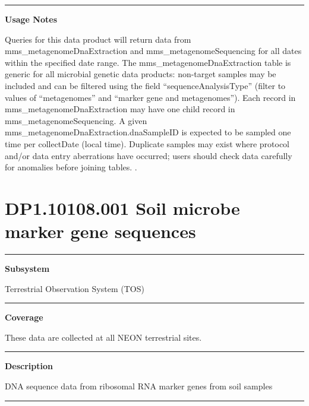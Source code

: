 \documentclass[]{article}
\begin{document}
\begin{center}\rule{0.5\linewidth}{\linethickness}\end{center}

\textbf{Usage Notes}

Queries for this data product will return data from
mms\_metagenomeDnaExtraction and mms\_metagenomeSequencing for all dates
within the specified date range. The mms\_metagenomeDnaExtraction table
is generic for all microbial genetic data products: non-target samples
may be included and can be filtered using the field
``sequenceAnalysisType'' (filter to values of ``metagenomes'' and
``marker gene and metagenomes''). Each record in
mms\_metagenomeDnaExtraction may have one child record in
mms\_metagenomeSequencing. A given
mms\_metagenomeDnaExtraction.dnaSampleID is expected to be sampled one
time per collectDate (local time). Duplicate samples may exist where
protocol and/or data entry aberrations have occurred; users should check
data carefully for anomalies before joining tables. \newpage
.

\section{DP1.10108.001 Soil microbe marker gene
sequences}\label{dp1.10108.001-soil-microbe-marker-gene-sequences}

\begin{center}\rule{0.5\linewidth}{\linethickness}\end{center}

\textbf{Subsystem}

Terrestrial Observation System (TOS)

\begin{center}\rule{0.5\linewidth}{\linethickness}\end{center}

\textbf{Coverage}

These data are collected at all NEON terrestrial sites.

\begin{center}\rule{0.5\linewidth}{\linethickness}\end{center}

\textbf{Description}

DNA sequence data from ribosomal RNA marker genes from soil samples

\begin{center}\rule{0.5\linewidth}{\linethickness}\end{center}
\end{document}

